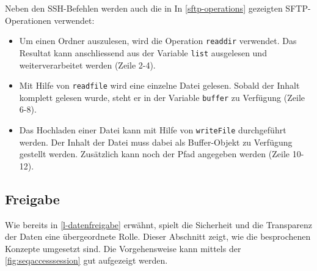 Neben den \gls{SSH}-Befehlen werden auch die in
In \autoref{sftp-operations} gezeigten \gls{SFTP}-Operationen verwendet:
\begin{itemize}
    \item Um einen Ordner auszulesen, wird die Operation \texttt{readdir} verwendet. Das Resultat kann anschliessend aus der Variable \texttt{list} ausgelesen und weiterverarbeitet werden (Zeile 2-4).\\
    \item Mit Hilfe von \texttt{readfile} wird eine einzelne Datei gelesen. Sobald der Inhalt komplett gelesen wurde, steht er in der Variable \texttt{buffer} zu Verfügung (Zeile 6-8).\\
    \item Das Hochladen einer Datei kann mit Hilfe von \texttt{writeFile} durchgeführt werden. Der Inhalt der Datei muss dabei als \gls{Buffer}-Objekt zu Verfügung gestellt werden. Zusätzlich kann noch der Pfad angegeben werden (Zeile 10-12).\\
\end{itemize}



\subsection{Freigabe} 


Wie bereits in \autoref{l-datenfreigabe} erwähnt, spielt die Sicherheit und die Transparenz der Daten eine übergeordnete Rolle. Dieser Abschnitt zeigt, wie die besprochenen Konzepte umgesetzt sind. Die Vorgehensweise kann mittels der \autoref{fig:seqaccesssession} gut aufgezeigt werden.

